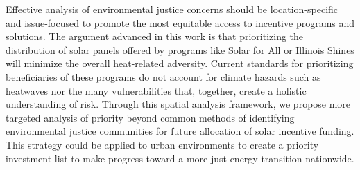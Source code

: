 Effective analysis of environmental justice concerns should be location-specific
and issue-focused to promote the most equitable access to incentive programs and
solutions. The argument advanced in this work is that prioritizing the distribution of solar
panels offered by programs like Solar for All or Illinois Shines will minimize the
overall heat-related adversity. Current standards for prioritizing beneficiaries
of these programs do not account for climate hazards such as heatwaves nor the
many vulnerabilities that, together, create a holistic understanding of risk.
Through this spatial analysis framework, we propose more targeted
analysis of priority beyond common methods of identifying environmental justice
communities for future allocation of solar incentive funding. This strategy could
be applied to urban environments to create a priority investment list to make
progress toward a more just energy transition nationwide.
